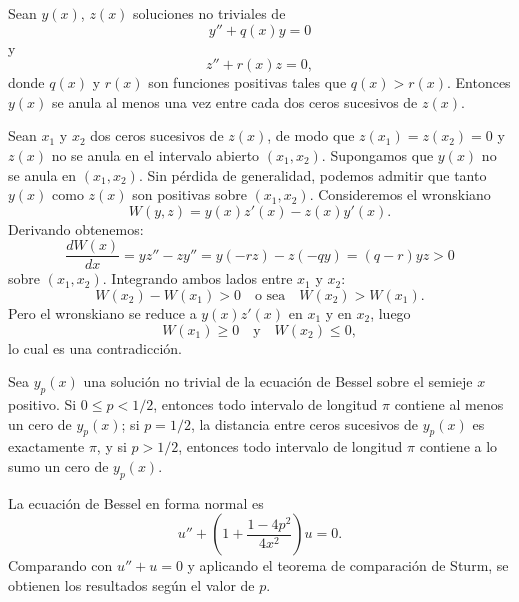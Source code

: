 \begin{theorem}
	Sean $y(x)$, $z(x)$ soluciones no triviales de
	$$y'' + q(x)y = 0$$
	y
	$$z'' + r(x)z = 0,$$
	donde $q(x)$ y $r(x)$ son funciones positivas tales que $q(x) > r(x)$. Entonces $y(x)$ se anula al menos una vez entre cada dos ceros sucesivos de $z(x)$.
\end{theorem}
\begin{demo}
	Sean $x_1$ y $x_2$ dos ceros sucesivos de $z(x)$, de modo que $z(x_1) = z(x_2) = 0$ y $z(x)$ no se anula en el intervalo abierto $(x_1, x_2)$. Supongamos que $y(x)$ no se anula en $(x_1, x_2)$. Sin pérdida de generalidad, podemos admitir que tanto $y(x)$ como $z(x)$ son positivas sobre $(x_1, x_2)$. Consideremos el wronskiano
	$$W(y, z) = y(x)z'(x) - z(x)y'(x).$$
	Derivando obtenemos:
	$$\frac{dW(x)}{dx} = yz'' - zy'' = y(-rz) - z(-qy) = (q - r)yz > 0$$
	sobre $(x_1, x_2)$. Integrando ambos lados entre $x_1$ y $x_2$:
	$$W(x_2) - W(x_1) > 0 \quad \text{o sea} \quad W(x_2) > W(x_1).$$
	Pero el wronskiano se reduce a $y(x)z'(x)$ en $x_1$ y en $x_2$, luego
	$$W(x_1) \geq 0 \quad \text{y} \quad W(x_2) \leq 0,$$
	lo cual es una contradicción.
\end{demo}

\begin{theorem}
	Sea $y_p(x)$ una solución no trivial de la ecuación de Bessel sobre el semieje $x$ positivo. Si $0 \leq p < 1/2$, entonces todo intervalo de longitud $\pi$ contiene al menos un cero de $y_p(x)$; si $p = 1/2$, la distancia entre ceros sucesivos de $y_p(x)$ es exactamente $\pi$, y si $p > 1/2$, entonces todo intervalo de longitud $\pi$ contiene a lo sumo un cero de $y_p(x)$.
\end{theorem}
\begin{demo}
	La ecuación de Bessel en forma normal es
	$$u'' + \left( 1 + \frac{1 - 4p^2}{4x^2} \right) u = 0.$$
	Comparando con $u'' + u = 0$ y aplicando el teorema de comparación de Sturm, se obtienen los resultados según el valor de $p$.
\end{demo}
